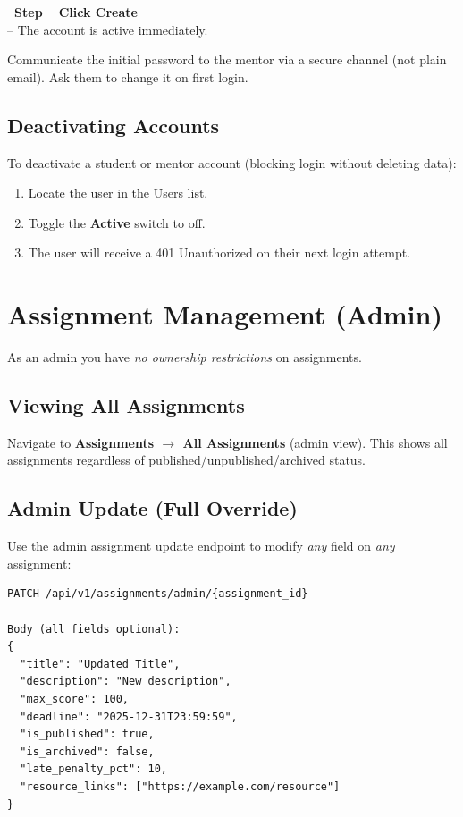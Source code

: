\documentclass[12pt,a4paper]{article}
\newcounter{stepnum}
\newcommand{\step}[1]{%
  \stepcounter{stepnum}%
  \vspace{6pt}%
  \noindent\colorbox{adminRed}{\color{white}\bfseries\small\ Step \thestepnum\ }%
  \hspace{4pt}\textbf{#1}\\[4pt]%
}
\begin{document}
\step{Click \textbf{Create}} -- The account is active immediately.

\begin{warnbox}
  Communicate the initial password to the mentor via a secure channel (not plain email). Ask them to change it on first login.
\end{warnbox}

\subsection{Deactivating Accounts}

To deactivate a student or mentor account (blocking login without deleting data):
\begin{enumerate}
  \item Locate the user in the Users list.
  \item Toggle the \textbf{Active} switch to off.
  \item The user will receive a 401 Unauthorized on their next login attempt.
\end{enumerate}

\section{Assignment Management (Admin)}

As an admin you have \emph{no ownership restrictions} on assignments.

\subsection{Viewing All Assignments}

Navigate to \textbf{Assignments $\rightarrow$ All Assignments} (admin view). This shows all assignments regardless of published/unpublished/archived status.

\subsection{Admin Update (Full Override)}

Use the admin assignment update endpoint to modify \emph{any} field on \emph{any} assignment:

\begin{lstlisting}
PATCH /api/v1/assignments/admin/{assignment_id}

Body (all fields optional):
{
  "title": "Updated Title",
  "description": "New description",
  "max_score": 100,
  "deadline": "2025-12-31T23:59:59",
  "is_published": true,
  "is_archived": false,
  "late_penalty_pct": 10,
  "resource_links": ["https://example.com/resource"]
}
\end{lstlisting}
\end{document}
